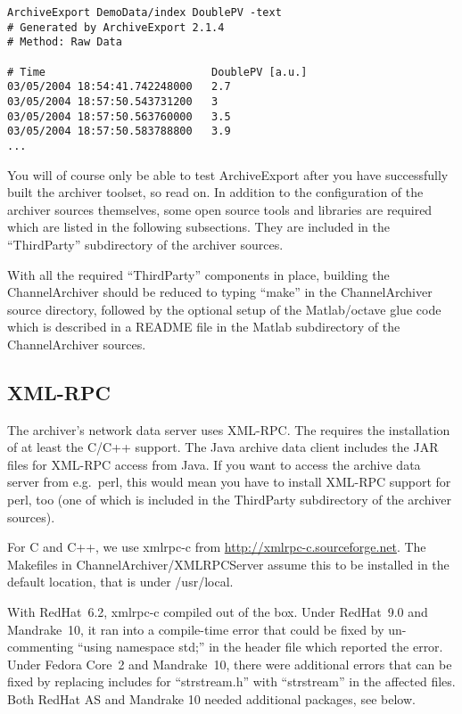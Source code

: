 \begin{lstlisting}[keywordstyle=\sffamily]
ArchiveExport DemoData/index DoublePV -text
# Generated by ArchiveExport 2.1.4
# Method: Raw Data

# Time                          DoublePV [a.u.]
03/05/2004 18:54:41.742248000   2.7
03/05/2004 18:57:50.543731200   3
03/05/2004 18:57:50.563760000   3.5
03/05/2004 18:57:50.583788800   3.9
...
\end{lstlisting}

\noindent You will of course only be able to test ArchiveExport after you
have successfully built the archiver toolset, so read on.
In addition to the configuration of the archiver sources
themselves, some open source tools and libraries are required which
are listed in the following subsections. They are included in the
``ThirdParty'' subdirectory of the archiver sources.

With all the required ``ThirdParty'' components in place, building the
ChannelArchiver should be reduced to typing ``make'' in the
ChannelArchiver source directory, followed by the optional setup of the
Matlab/octave glue code which is described in a README file in the
Matlab subdirectory of the ChannelArchiver sources.

\subsection{XML-RPC}
The archiver's network data server uses XML-RPC. The  requires the installation of at least the C/C++ support. The
Java archive data client includes the JAR files for XML-RPC access
from Java. If you want to access the archive data server from e.g.\ perl,
this would mean you have to install XML-RPC support for perl, too
(one of which is included in the ThirdParty subdirectory of the
archiver sources).

For C and C++, we use xmlrpc-c from
\href{http://xmlrpc-c.sourceforge.net}{http://xmlrpc-c.sourceforge.net}.
The Makefiles in ChannelArchiver/XMLRPCServer assume this to be
installed in the default location, that is under /usr/local.

With RedHat~6.2, xmlrpc-c compiled out of the box.  Under RedHat~9.0
and Mandrake~10, it ran into a compile-time error that could be fixed
by un-commenting ``using namespace std;'' in the header file which
reported the error.  Under Fedora Core~2 and Mandrake~10, there were
additional errors that can be fixed by replacing includes for
``strstream.h'' with ``strstream'' in the affected files.  Both RedHat
AS and Mandrake 10 needed additional packages, see below.

